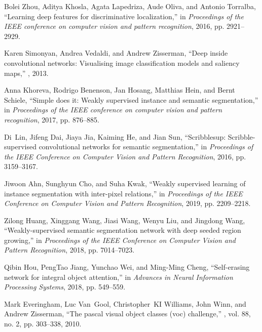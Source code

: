 \documentclass{article}
\begin{document}
\begin{thebibliography}{10}
Bolei Zhou, Aditya Khosla, Agata Lapedriza, Aude Oliva, and Antonio Torralba,
\newblock ``Learning deep features for discriminative localization,''
\newblock in {\em Proceedings of the IEEE conference on computer vision and
  pattern recognition}, 2016, pp. 2921--2929.

Karen Simonyan, Andrea Vedaldi, and Andrew Zisserman,
\newblock ``Deep inside convolutional networks: Visualising image
  classification models and saliency maps,''
, 2013.

Anna Khoreva, Rodrigo Benenson, Jan Hosang, Matthias Hein, and Bernt Schiele,
\newblock ``Simple does it: Weakly supervised instance and semantic
  segmentation,''
\newblock in {\em Proceedings of the IEEE conference on computer vision and
  pattern recognition}, 2017, pp. 876--885.

Di~Lin, Jifeng Dai, Jiaya Jia, Kaiming He, and Jian Sun,
\newblock ``Scribblesup: Scribble-supervised convolutional networks for
  semantic segmentation,''
\newblock in {\em Proceedings of the IEEE Conference on Computer Vision and
  Pattern Recognition}, 2016, pp. 3159--3167.

Jiwoon Ahn, Sunghyun Cho, and Suha Kwak,
\newblock ``Weakly supervised learning of instance segmentation with
  inter-pixel relations,''
\newblock in {\em Proceedings of the IEEE Conference on Computer Vision and
  Pattern Recognition}, 2019, pp. 2209--2218.

Zilong Huang, Xinggang Wang, Jiasi Wang, Wenyu Liu, and Jingdong Wang,
\newblock ``Weakly-supervised semantic segmentation network with deep seeded
  region growing,''
\newblock in {\em Proceedings of the IEEE Conference on Computer Vision and
  Pattern Recognition}, 2018, pp. 7014--7023.

Qibin Hou, PengTao Jiang, Yunchao Wei, and Ming-Ming Cheng,
\newblock ``Self-erasing network for integral object attention,''
\newblock in {\em Advances in Neural Information Processing Systems}, 2018, pp.
  549--559.

Mark Everingham, Luc Van~Gool, Christopher~KI Williams, John Winn, and Andrew
  Zisserman,
\newblock ``The pascal visual object classes (voc) challenge,''
, vol. 88, no. 2, pp.
  303--338, 2010.


\end{thebibliography}
\end{document}
